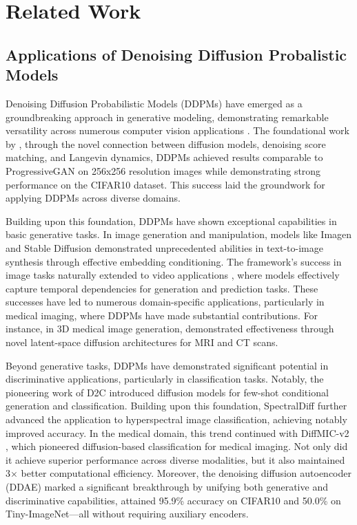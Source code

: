 \documentclass[a4paper,fleqn]{cas-sc}
\begin{document}
\section{Related Work}
\subsection{Applications of Denoising Diffusion Probalistic Models}

Denoising Diffusion Probabilistic Models (DDPMs) have emerged as a groundbreaking approach in generative modeling, demonstrating remarkable versatility across numerous computer vision applications \cite{croitoru2023diffusion}. The foundational work by \cite{ho2020denoising}, through the novel connection between diffusion models, denoising score matching, and Langevin dynamics, DDPMs achieved results comparable to ProgressiveGAN on 256x256 resolution images while demonstrating strong performance on the CIFAR10 dataset. This success laid the groundwork for applying DDPMs across diverse domains.

Building upon this foundation, DDPMs have shown exceptional capabilities in basic generative tasks. In image generation and manipulation, models like Imagen \cite{saharia2022photorealistic} and Stable Diffusion \cite{rombach2022high} demonstrated unprecedented abilities in text-to-image synthesis through effective embedding conditioning. The framework's success in image tasks naturally extended to video applications \cite{ho2022video,yang2023diffusion,hoppe2022diffusion}, where models effectively capture temporal dependencies for generation and prediction tasks. These successes have led to numerous domain-specific applications, particularly in medical imaging, where DDPMs have made substantial contributions. For instance, in 3D medical image generation, \cite{khader2023denoising} demonstrated effectiveness through novel latent-space diffusion architectures for MRI and CT scans. 

Beyond generative tasks, DDPMs have demonstrated significant potential in discriminative applications, particularly in classification tasks. Notably, the pioneering work of D2C \cite{de2022d2c} introduced diffusion models for few-shot conditional generation and classification. Building upon this foundation, SpectralDiff \cite{chen2023spectraldiff} further advanced the application to hyperspectral image classification, achieving notably improved accuracy. In the medical domain, this trend continued with DiffMIC-v2 \cite{yang2025diffmic}, which pioneered diffusion-based classification for medical imaging. Not only did it achieve superior performance across diverse modalities, but it also maintained 3× better computational efficiency. Moreover, the denoising diffusion autoencoder (DDAE) \cite{xiang2023denoising} marked a significant breakthrough by unifying both generative and discriminative capabilities, attained 95.9\% accuracy on CIFAR10 and 50.0\% on Tiny-ImageNet—all without requiring auxiliary encoders.
\end{document}

